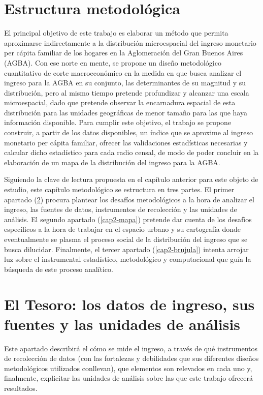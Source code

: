 
	
	\section{Estructura metodológica}
	
El principal objetivo de este trabajo es elaborar un método que permita aproximarse indirectamente a la distribución microespacial del ingreso monetario per cápita familiar de los hogares en la Aglomeración del Gran Buenos Aires (AGBA). Con ese norte en mente, se propone un diseño metodológico cuantitativo de corte macroeconómico en la medida en que busca analizar el ingreso para la AGBA en su conjunto, las determinantes de su magnitud y su distribución, pero al mismo tiempo pretende profundizar y alcanzar una escala microespacial, dado que pretende observar la encarnadura espacial de esta distribución para las unidades geográficas de menor tamaño para las que haya información disponible. Para cumplir este objetivo, el trabajo se propone construir, a partir de los datos disponibles, un índice que se aproxime al ingreso monetario per cápita familiar, ofrecer las validaciones estadísticas necesarias y calcular dicho estadístico para cada radio censal, de modo de poder concluir en la elaboración de un mapa de la distribución del ingreso para la AGBA. 

Siguiendo la clave de lectura propuesta en el capítulo anterior para este objeto de estudio, este capítulo metodológico se estructura en tres partes. El primer apartado (\ref{cap2-tesoro}) procura plantear los desafíos metodológicos a la hora de analizar el ingreso, las fuentes de datos, instrumentos de recolección y las unidades de análisis. El segundo apartado (\ref{cap2-mapa}) pretende dar cuenta de los desafíos específicos a la hora de trabajar en el espacio urbano y su cartografía donde eventualmente se plasma el proceso social de la distribución del ingreso que se busca dilucidar. Finalmente, el tercer apartado (\ref{cap2-brujula}) intenta arrojar luz sobre el instrumental estadístico, metodológico y computacional que guía la búsqueda de este proceso analítico. 

	\section{El Tesoro: los datos de ingreso, sus fuentes y las unidades de análisis}\label{cap2-tesoro}
	
Este apartado describirá el cómo se mide el ingreso, a través de qué instrumentos de recolección de datos (con las fortalezas y debilidades que sus diferentes diseños metodológicos utilizados conllevan), que elementos son relevados en cada uno y, finalmente, explicitar las unidades de análisis sobre las que este trabajo ofrecerá resultados.
	
